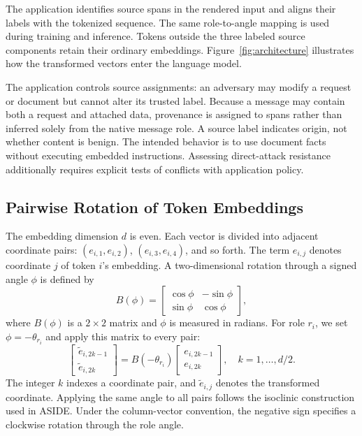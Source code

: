 \documentclass[conference,letterpaper,10pt]{IEEEtran}
\begin{document}
The application identifies source spans in the rendered input and aligns their
labels with the tokenized sequence. The same role-to-angle mapping is used
during training and inference. Tokens outside the three labeled source
components retain their ordinary embeddings. Figure~\ref{fig:architecture}
illustrates how the transformed vectors enter the language model.

The application controls source assignments: an adversary may modify a request
or document but cannot alter its trusted label. Because a message may contain
both a request and attached data, provenance is assigned to spans rather than
inferred solely from the native message role. A source label indicates origin,
not whether content is benign. The intended behavior is to use document facts
without executing embedded instructions. Assessing direct-attack resistance
additionally requires explicit tests of conflicts with application policy.

\subsection{Pairwise Rotation of Token Embeddings}
The embedding dimension $d$ is even. Each vector is divided into adjacent
coordinate pairs: $(e_{i,1},e_{i,2})$, $(e_{i,3},e_{i,4})$, and so forth. The
term $e_{i,j}$ denotes coordinate $j$ of token $i$'s embedding. A
two-dimensional rotation through a signed angle $\phi$ is defined by
\begin{equation}
B(\phi)=
\begin{bmatrix}
\cos\phi&-\sin\phi\\
\sin\phi&\cos\phi
\end{bmatrix},
\label{eq:block}
\end{equation}
where $B(\phi)$ is a $2\times2$ matrix and $\phi$ is measured in radians. For
role $r_i$, we set $\phi=-\theta_{r_i}$ and apply this matrix to every pair:
\begin{equation}
\begin{bmatrix}\widetilde e_{i,2k-1}\\\widetilde e_{i,2k}\end{bmatrix}
=B(-\theta_{r_i})
\begin{bmatrix}e_{i,2k-1}\\e_{i,2k}\end{bmatrix},
\quad k=1,\ldots,d/2.
\label{eq:pairs}
\end{equation}
The integer $k$ indexes a coordinate pair, and $\widetilde e_{i,j}$ denotes
the transformed coordinate. Applying the same angle to all pairs follows the
isoclinic construction used in ASIDE. Under the column-vector convention, the
negative sign specifies a clockwise rotation through the role angle.
\end{document}
